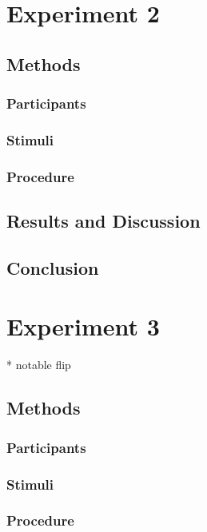 \documentclass[man]{apa2}
\begin{document}
\section{Experiment 2}

\subsection{Methods}

\subsubsection{Participants} 
\subsubsection{Stimuli}



\subsubsection{Procedure}

\subsection{Results and Discussion}

\subsection{Conclusion}



\section{Experiment 3}
* notable flip
\subsection{Methods}

\subsubsection{Participants} 
\subsubsection{Stimuli}


\subsubsection{Procedure}
\end{document}
